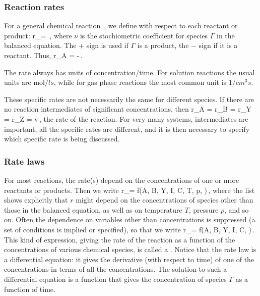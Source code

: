 \subsubsection{Reaction rates}
For a general chemical reaction
\beq
{}\,,
\eeq
we define  with respect to each reactant or product:
\beq
r_\Gamma = \pm {}\,,
\eeq
where $\nu$ is the stochiometric coefficient for species $\Gamma$ in the balanced equation. The + sign is used if $\Gamma$ is a product, the − sign if it is a reactant. Thus,
\beq
r_{\ce A} = -\,.
\eeq

The rate always has units of concentration/time. For solution reactions the usual units are $\si{\mol/ls}$, while for gas phase reactions the most common unit is $\si{1/cm^{3}s}$.

These specific rates are not necessarily the same for different species. If there are no reaction intermediates of significant concentrations, then
\beq
r_{\ce A} = r_{\ce B} = r_{\ce Y} = r_{\ce Z} = v\,,
\eeq
the rate of the reaction. For very many systems, intermediates are important, all the specific rates are different, and it is then necessary to specify which specific rate is being discussed.


\subsubsection{Rate laws}
For most reactions, the rate(s) depend on the concentrations of one or more reactants or products. Then we write
\beq
r_\Gamma = f\left(\conc A, \conc B, \conc Y, \conc I, \conc C, T, p, \dotsc \right)\,,
\eeq
where the list shows explicitly that $r$ might depend on the concentrations of species other than those in the balanced equation, as well as on temperature $T$, pressure $p$, and so on. Often the dependence on variables other than concentrations is suppressed (a set of conditions is implied or specified), so that we write
\beq
r_\Gamma = f\left(\conc A, \conc B, \conc Y, \conc I, \conc C, \dotsc \right)\,.
\eeq
This kind of expression, giving the rate of the reaction as a function of the concentrations of various chemical species, is called a . Notice that the rate law is a differential equation: it gives the derivative (with respect to time) of one of the concentrations in terms of all the concentrations. The solution to such a differential equation is a function that gives the concentration of species $\Gamma$ as a function of time.

